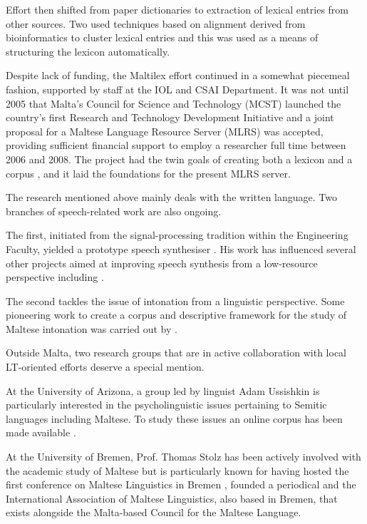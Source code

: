 \documentclass[]{../../metanetpaper}
\begin{document}
\begin{multicols}{2}
Effort then shifted from paper dictionaries to extraction of lexical entries from other sources. Two \cite{Dalli:2001, Attard:2005} used techniques based on alignment derived from bioinformatics to cluster lexical entries and this was used as a means of structuring the lexicon automatically. 

Despite lack of funding, the Maltilex effort continued in a somewhat piecemeal fashion, supported by staff at the IOL and CSAI Department. It was not until 2005 that Malta's Council for Science and Technology (MCST) launched the country's first Research and Technology Development Initiative and a joint proposal for a Maltese Language Resource Server (MLRS) was accepted, providing sufficient financial support to employ a researcher full time between 2006 and 2008. The project had the twin goals of creating both a lexicon and a corpus \cite{Rosner:2009}, and it laid the foundations for the present MLRS server.

The research mentioned above mainly deals with the written language. Two branches of speech-related work are also ongoing. 

The first, initiated from the signal-processing tradition within the Engineering Faculty, yielded a prototype speech synthesiser \cite{Micallef:1997}. His work has influenced several other projects aimed at improving speech synthesis from a low-resource perspective including \cite{Calleja:2002, Farrugia:2005, Camilleri:2010, Borg-et-al:2011}.

The second tackles the issue of intonation \cite{Vella:2009} from a linguistic perspective. Some pioneering work to create a corpus and descriptive framework for the study of Maltese intonation was carried out by \cite{Vella-Farrugia:2006}. 

Outside Malta, two research groups that are in active collaboration with local LT-oriented efforts deserve a special mention.

At the University of Arizona, a group led by linguist Adam Ussishkin is particularly interested in the psycholinguistic issues pertaining to Semitic languages including Maltese. To study these issues an online corpus has been made available \cite{Ussishkin-et-al:2009}. 

At the University of Bremen, Prof. Thomas Stolz has been actively involved with the academic study of Maltese but is particularly known for having hosted the first conference on Maltese Linguistics in Bremen \cite{Comrie-et-al:2009}, founded a periodical \cite{GHILM2} and the International Association of Maltese Linguistics, also based in Bremen, that exists alongside the Malta-based Council for the Maltese Language.


\end{multicols}
\end{document}
